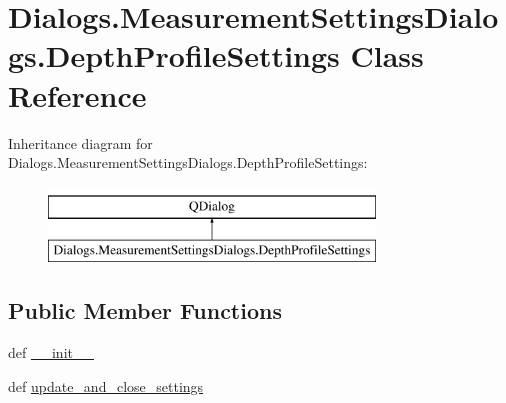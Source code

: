 \hypertarget{classDialogs_1_1MeasurementSettingsDialogs_1_1DepthProfileSettings}{\section{Dialogs.\-Measurement\-Settings\-Dialogs.\-Depth\-Profile\-Settings Class Reference}
\label{classDialogs_1_1MeasurementSettingsDialogs_1_1DepthProfileSettings}
}
Inheritance diagram for Dialogs.\-Measurement\-Settings\-Dialogs.\-Depth\-Profile\-Settings\-:\begin{figure}[H]
\begin{center}
\leavevmode
\includegraphics[height=2.000000cm]{classDialogs_1_1MeasurementSettingsDialogs_1_1DepthProfileSettings}
\end{center}
\end{figure}
\subsection*{Public Member Functions}
\begin{DoxyCompactItemize}
\item 
def \hyperlink{classDialogs_1_1MeasurementSettingsDialogs_1_1DepthProfileSettings_ad4116df69c127620657a3fde94b67178}{\-\_\-\-\_\-init\-\_\-\-\_\-}
\item 
def \hyperlink{classDialogs_1_1MeasurementSettingsDialogs_1_1DepthProfileSettings_aeddd8beb2aafb2cdb5d8dc3f70429a06}{update\-\_\-and\-\_\-close\-\_\-settings}
\end{DoxyCompactItemize}
